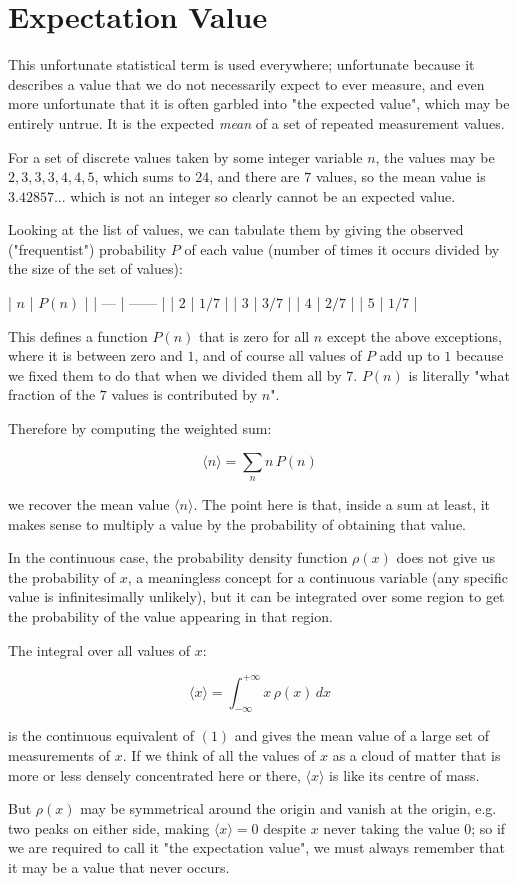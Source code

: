 \chapter{Expectation Value}

This unfortunate statistical term is used everywhere; unfortunate because it describes a value that we do not necessarily expect to ever measure, and even more unfortunate that it is often garbled into "the expected value", which may be entirely untrue. It is the expected \textit{mean} of a set of repeated measurement values.

For a set of discrete values taken by some integer variable $n$, the values may be $2, 3, 3, 3, 4, 4, 5$, which sums to $24$, and there are $7$ values, so the mean value is $3.42857...$ which is not an integer so clearly cannot be an expected value.

Looking at the list of values, we can tabulate them by giving the observed ("frequentist") probability $P$ of each value (number of times it occurs divided by the size of the set of values):

| $n$ | $P(n)$ |
| --- | ------ |
| $2$ | $1/7$  |
| $3$ | $3/7$  |
| $4$ | $2/7$  |
| $5$ | $1/7$  |

This defines a function $P(n)$ that is zero for all $n$ except the above exceptions, where it is between zero and $1$, and of course all values of $P$ add up to $1$ because we fixed them to do that when we divided them all by $7$. $P(n)$ is literally "what fraction of the $7$ values is contributed by $n$".

Therefore by computing the weighted sum:

$$
\langle {n} \rangle = \sum_n{n\,P(n)}
$$

we recover the mean value $\langle{n}\rangle$. The point here is that, inside a sum at least, it makes sense to multiply a value by the probability of obtaining that value.

In the continuous case, the probability density function $\rho(x)$ does not give us the probability of $x$, a meaningless concept for a continuous variable (any specific value is infinitesimally unlikely), but it can be integrated over some region to get the probability of the value appearing in that region.

The integral over all values of $x$:

$$
\langle x \rangle =
\int_{-\infty}^{+\infty}
x\,\rho(x)
\,dx
$$

is the continuous equivalent of $(1)$ and gives the mean value of a large set of measurements of $x$. If we think of all the values of $x$ as a cloud of matter that is more or less densely concentrated here or there, $\langle x \rangle$ is like its centre of mass.

But $\rho(x)$ may be symmetrical around the origin and vanish at the origin, e.g. two peaks on either side, making $\langle x \rangle = 0$ despite $x$ never taking the value $0$; so if we are required to call it "the expectation value", we must always remember that it may be a value that never occurs.
